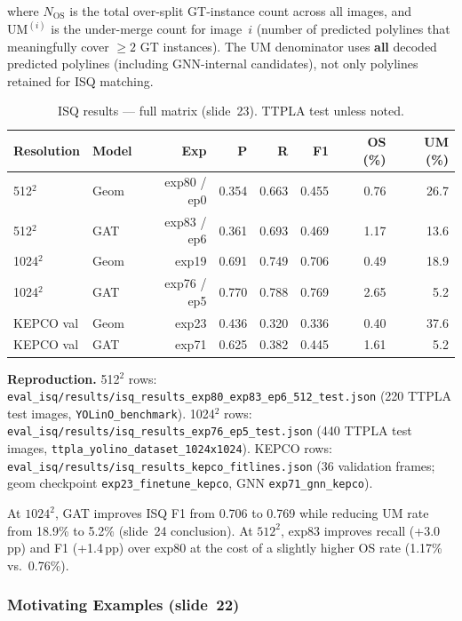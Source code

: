 \documentclass[11pt,a4paper]{article}
\begin{document}
where $N_{\text{OS}}$ is the total over-split GT-instance count across all images,
and $\text{UM}^{(i)}$ is the under-merge count for image~$i$
(number of predicted polylines that meaningfully cover $\geq 2$ GT instances).
The UM denominator uses \textbf{all} decoded predicted polylines
(including GNN-internal candidates), not only polylines retained for ISQ matching.

\begin{table}[H]
\centering
\caption{ISQ results --- full matrix (slide~23). TTPLA test unless noted.}
\small
\begin{tabular}{llrrrrrr}
\toprule
Resolution & Model & Exp & P & R & F1 & OS (\%) & UM (\%) \\
\midrule
512$^2$  & Geom & exp80 / ep0  & 0.354 & 0.663 & 0.455 & 0.76 & 26.7 \\
512$^2$  & GAT  & exp83 / ep6   & 0.361 & 0.693 & 0.469 & 1.17 & 13.6 \\
1024$^2$ & Geom & exp19          & 0.691 & 0.749 & 0.706 & 0.49 & 18.9 \\
1024$^2$ & GAT  & exp76 / ep5    & 0.770 & 0.788 & 0.769 & 2.65 & 5.2 \\
KEPCO val & Geom & exp23          & 0.436 & 0.320 & 0.336 & 0.40 & 37.6 \\
KEPCO val & GAT  & exp71          & 0.625 & 0.382 & 0.445 & 1.61 & 5.2 \\
\bottomrule
\end{tabular}
\end{table}

\noindent
\textbf{Reproduction.}
512$^2$ rows: \texttt{eval\_isq/results/isq\_results\_exp80\_exp83\_ep6\_512\_test.json}
(220 TTPLA test images, \texttt{YOLinO\_benchmark}).
1024$^2$ rows: \texttt{eval\_isq/results/isq\_results\_exp76\_ep5\_test.json}
(440 TTPLA test images, \texttt{ttpla\_yolino\_dataset\_1024x1024}).
KEPCO rows: \texttt{eval\_isq/results/isq\_results\_kepco\_fitlines.json}
(36 validation frames; geom checkpoint \texttt{exp23\_finetune\_kepco}, GNN \texttt{exp71\_gnn\_kepco}).

At $1024^2$, GAT improves ISQ F1 from 0.706 to 0.769 while reducing UM rate
from 18.9\% to 5.2\% (slide~24 conclusion).
At $512^2$, exp83 improves recall (+3.0\,pp) and F1 (+1.4\,pp) over exp80
at the cost of a slightly higher OS rate (1.17\% vs.\ 0.76\%).

\subsubsection{Motivating Examples (slide~22)}
\end{document}
